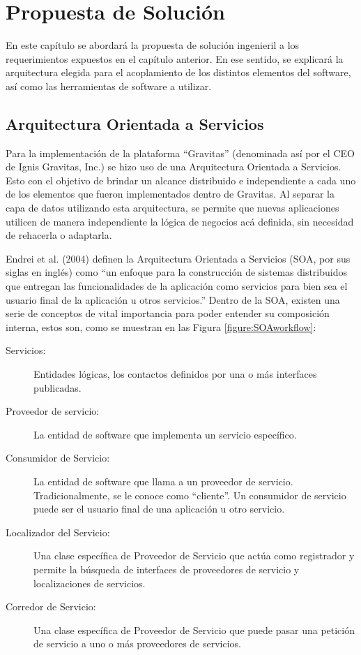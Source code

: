 \chapter{Propuesta de Solución}

En este capítulo se abordará la propuesta de solución ingenieril a los requerimientos expuestos en el capítulo anterior. En ese sentido, se explicará la arquitectura elegida para el acoplamiento de los distintos elementos del software, así como las herramientas de software a utilizar.

\section{Arquitectura Orientada a Servicios}

Para la implementación de la plataforma “Gravitas” (denominada así por el CEO de Ignis Gravitas, Inc.) se hizo uso de una Arquitectura Orientada a Servicios. Esto con el objetivo de brindar un alcance distribuido e independiente a cada uno de los elementos que fueron implementados dentro de Gravitas. Al separar la capa de datos utilizando esta arquitectura, se permite que nuevas aplicaciones utilicen de manera independiente la lógica de negocios acá definida, sin necesidad de rehacerla o adaptarla.

Endrei et al. (2004) definen la Arquitectura Orientada a Servicios (SOA, por sus siglas en inglés) como “un enfoque para la construcción de sistemas distribuidos que entregan las funcionalidades de la aplicación como servicios para bien sea el usuario final de la aplicación u otros servicios.” \cite{endrei2004}
Dentro de la SOA, existen una serie de conceptos de vital importancia para poder entender su composición interna, estos son, como se muestran en las Figura \ref{figure:SOAworkflow}:

\begin{description}
    \item[Servicios:] Entidades lógicas, los contactos definidos por una o más interfaces publicadas.
    \item[Proveedor de servicio:] La entidad de software que implementa un servicio específico.
    \item[Consumidor de Servicio:]  La entidad de software que llama a un proveedor de servicio. Tradicionalmente, se le conoce como “cliente”. Un consumidor de servicio puede ser el usuario final de una aplicación u otro servicio.
    \item[Localizador del Servicio:] Una clase específica de Proveedor de Servicio que actúa como registrador y permite la búsqueda de interfaces de proveedores de servicio y localizaciones de servicios.
    \item[Corredor de Servicio:] Una clase específica de Proveedor de Servicio que puede pasar una petición de servicio a uno o más proveedores de servicios.
\end{description}

